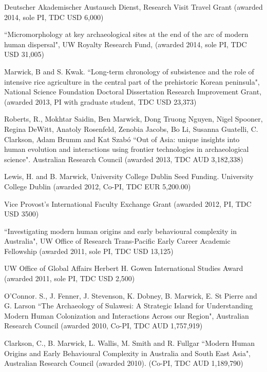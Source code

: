 \medskip

\ind  Deutscher Akademischer Austausch Dienst, Research Visit Travel Grant (awarded 2014, sole PI, TDC USD 6,000)

\ind  ``Micromorphology at key archaeological sites at the end of the arc of modern human dispersal", UW Royalty Research Fund, (awarded 2014, sole PI, TDC USD 31,005)

\ind  Marwick, B and S. Kwak. ``Long-term chronology of subsistence and the role of intensive rice agriculture in the central part of the prehistoric Korean peninsula", National Science Foundation Doctoral Dissertation Research Improvement Grant, (awarded 2013,  PI with graduate student, TDC USD 23,373)

\ind  Roberts, R., Mokhtar Saidin, Ben Marwick, Dong Truong Nguyen, Nigel Spooner, Regina DeWitt, Anatoly Rosenfeld, Zenobia Jacobs, Bo Li, Susanna Guatelli, C. Clarkson, Adam Brumm and Kat Szabó ``Out of Asia: unique insights into human evolution and interactions using frontier technologies in archaeological science".  Australian Research Council (awarded 2013, TDC AUD 3,182,338)

\ind Lewis, H. and B. Marwick,  University College Dublin Seed Funding. University College Dublin (awarded 2012, Co-PI, TDC EUR 5,200.00) 

\ind Vice Provost’s International Faculty Exchange Grant (awarded 2012, PI, TDC USD 3500)

\ind  ``Investigating modern human origins and early behavioural complexity in Australia", UW Office of Research Trans-Pacific Early Career Academic Fellowship (awarded 2011, sole PI, TDC USD 13,125)

\ind UW Office of Global Affairs Herbert H. Gowen International Studies Award (awarded 2011, sole PI, TDC USD 2,500)

\ind O’Connor. S., J. Fenner, J. Stevenson, K. Dobney, B. Marwick, E. St Pierre and G. Larson ``The Archaeology of Sulawesi: A Strategic Island for Understanding Modern Human Colonization and Interactions Across our Region", Australian Research Council (awarded 2010, Co-PI, TDC AUD 1,757,919)

\ind Clarkson, C., B. Marwick, L. Wallis, M. Smith and R. Fullgar  ``Modern Human Origins and Early Behavioural Complexity in Australia and South East Asia", Australian Research Council (awarded 2010). (Co-PI, TDC AUD 1,189,790)

